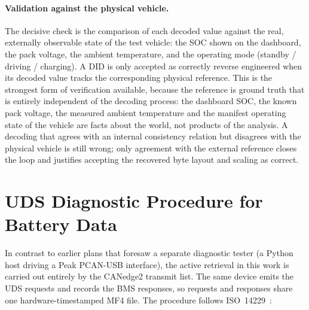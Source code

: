 \documentclass[11pt,a4paper,oneside,parskip=half]{scrreprt}
\begin{document}
\paragraph{Validation against the physical vehicle.} The decisive check is the comparison of each decoded value against the real, externally observable state of the test vehicle: the SOC shown on the dashboard, the pack voltage, the ambient temperature, and the operating mode (standby / driving / charging). A DID is only accepted as correctly reverse engineered when its decoded value tracks the corresponding physical reference. This is the strongest form of verification available, because the reference is ground truth that is entirely independent of the decoding process: the dashboard SOC, the known pack voltage, the measured ambient temperature and the manifest operating state of the vehicle are facts about the world, not products of the analysis. A decoding that agrees with an internal consistency relation but disagrees with the physical vehicle is still wrong; only agreement with the external reference closes the loop and justifies accepting the recovered byte layout and scaling as correct.

\section{UDS Diagnostic Procedure for Battery Data}
\label{sec:uds_procedure}
In contrast to earlier plans that foresaw a separate diagnostic tester (a Python host driving a Peak PCAN-USB interface), the active retrieval in this work is carried out entirely by the CANedge2 transmit list. The same device emits the UDS requests and records the BMS responses, so requests and responses share one hardware-timestamped MF4 file. The procedure follows ISO~14229~\cite{iso14229}:
\end{document}
